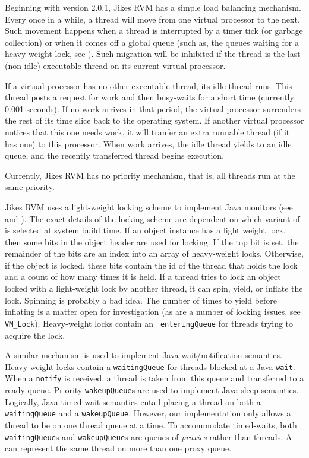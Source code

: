 Beginning with version 2.0.1, Jikes RVM has a simple load balancing
mechanism. Every once in a while, a thread will move from one virtual
processor to the next.  Such movement happens when a thread is
interrupted by a timer tick (or garbage collection) or when it comes
off a global queue (such as, the queues waiting for a heavy-weight
lock, see ).  Such migration will be
inhibited if the thread is the last (non-idle) executable thread on
its current virtual processor.  

If a virtual processor has no other executable thread, its idle thread
runs.  This thread posts a request for work and then busy-waits for a
short time (currently 0.001 seconds).  If no work arrives in that
period, the virtual processor surrenders the rest of its time slice
back to the operating system.  If another virtual processor notices
that this one needs work, it will tranfer an extra runnable thread (if
it has one) to this processor.  When work arrives, the idle thread
yields to an idle queue, and the recently transferred thread begins
execution.

Currently, Jikes RVM has no priority mechanism, that is, all threads run at
the same priority.

Jikes RVM uses a light-weight locking scheme to implement Java monitors (see
 and 
). The exact details of the
locking scheme are dependent on which variant of 
 is selected at
system build time.  If an object instance has a light weight lock,
then some bits in the object header are used for locking.  
If the top bit is set, the remainder of the bits 
are an index into an array of heavy-weight locks.
Otherwise, if the object is locked, these bits contain the id of the
thread that holds the lock and a count of how many times it is held.
If a thread tries to lock an object locked with a light-weight lock by
another thread, it can spin, yield, or inflate the lock.  Spinning is
probably a bad idea.  The number of times to yield before inflating is
a matter open for investigation (as are a number of locking
issues, see {\tt VM\_Lock}).  Heavy-weight locks contain an {\tt
enteringQueue} for threads trying to acquire the lock.

A similar mechanism is used to implement Java wait/notification
semantics.  Heavy-weight locks contain a {\tt waitingQueue} for
threads blocked at a Java {\tt wait}.  When a {\tt notify} is
received, a thread is taken from this queue and transferred to a ready
queue.  Priority {\tt wakeupQueue}s are used to implement Java sleep
semantics.  Logically, Java timed-wait semantics entail placing a
thread on both a {\tt waitingQueue} and a {\tt wakeupQueue}.  However, our
implementation only allows a thread to be on one thread queue at
a time.  To accommodate timed-waits, both {\tt wai\-ting\-Queue}s and
{\tt wake\-up\-Queue}s are queues of {\em proxies} rather than threads.
A  can represent the same thread
on more than one proxy queue.
